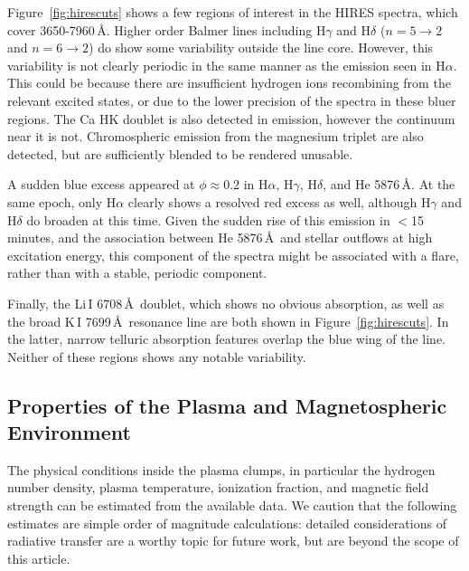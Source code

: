 \documentclass{nature3}
\begin{document}
\begin{methods}
Figure~\ref{fig:hirescuts} shows a few regions of interest in the
HIRES spectra, which cover 3650-7960\,\AA.  Higher order Balmer lines
including H$\gamma$ and H$\delta$ ($n=5\rightarrow2$ and
$n=6\rightarrow2$) do show some variability
outside the line core.  However, this variability is not clearly
periodic in the same manner as the emission seen in H$\alpha$.  This
could be because there are insufficient hydrogen ions recombining from
the relevant excited states, or due to the lower precision of the
spectra in these bluer regions.  The Ca HK doublet is
also detected in emission, however the continuum near it is not.
Chromospheric emission from the magnesium triplet are also
detected, but are sufficiently blended to be rendered unusable.

A sudden blue excess appeared at $\phi$$\approx$0.2 in H$\alpha$,
H$\gamma$, H$\delta$, and He 5876\,\AA.  At the same epoch, only
H$\alpha$ clearly shows a resolved red excess as well, although
H$\gamma$ and H$\delta$ do broaden at this time.  Given the sudden
rise of this emission in $<$15\,minutes, and the association between
He 5876\,\AA\ and stellar outflows at high excitation energy, this
component of the spectra might be associated with a flare, rather
than with a stable, periodic component.

Finally, the Li\,\textsc{I} 6708\,\AA\ doublet, which shows no obvious
absorption, as well as the broad K\,\textsc{I} 7699\,\AA\ resonance
line are both shown in Figure~\ref{fig:hirescuts}.  In the latter,
narrow telluric absorption features overlap the blue wing of the line.
Neither of these regions shows any notable variability.


\subsection{Properties of the Plasma and Magnetospheric Environment}\phantom{+}
\label{subsec:gas}

The physical conditions inside the plasma clumps, in particular the
hydrogen number density, plasma temperature, ionization fraction, and
magnetic field strength can be estimated from the available data.
We caution that the following estimates are simple order of magnitude
calculations: detailed considerations of radiative transfer are a
worthy topic for future work, but are beyond the scope of this
article.


\end{methods}
\end{document}
